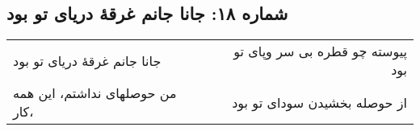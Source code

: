 \begin{center}
\section*{شماره ۱۸: جانا جانم غرقۀ دریای تو بود}
\label{sec:018}
\begin{longtable}{l p{0.5cm} r}
جانا جانم غرقهٔ دریای تو بود
&&
پیوسته چو قطره بی سر وپای تو بود
\\
من حوصلهای نداشتم، این همه کار،
&&
از حوصله بخشیدن سودای تو بود
\\
\end{longtable}
\end{center}
